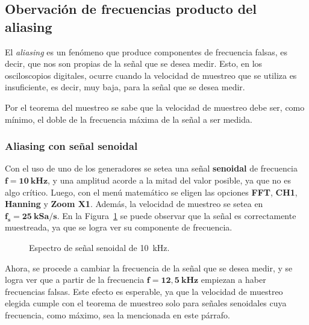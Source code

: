   \pagebreak
  \subsection{Obervación de frecuencias producto del aliasing}
    El \textit{aliasing} es un fenómeno que produce componentes de frecuencia falsas, es decir,
    que nos son propias de la señal que se desea medir. Esto, en los osciloscopios digitales,
    ocurre cuando la velocidad de muestreo que se utiliza es insuficiente, es decir, muy baja,
    para la señal que se desea medir.
    
    Por el teorema del muestreo se sabe que la velocidad de muestreo debe ser, como mínimo, el
    doble de la frecuencia máxima de la señal a ser medida.

    \subsubsection{Aliasing con señal senoidal}
      Con el uso de uno de los generadores se setea una señal \textbf{senoidal} de frecuencia
      $\mathbf{f = 10~kHz}$, y una amplitud acorde a la mitad del valor posible, ya que no es
      algo crítico. Luego, con el menú matemático se eligen las opciones \textbf{FFT}, \textbf{CH1},
      \textbf{Hanning} y \textbf{Zoom X1}. Además, la velocidad de muestreo se setea en 
      $\mathbf{f_s = 25~kSa/s}$. En la Figura~\ref{fig:Exp3Señal10k} se puede observar que la señal 
      es correctamente muestreada, ya que se logra ver su componente de frecuencia.
      
      \begin{figure}[H]
        \centering
        \caption{Espectro de señal senoidal de 10~kHz.}
        \label{fig:Exp3Señal10k}
      \end{figure}
      
      Ahora, se procede a cambiar la frecuencia de la señal que se desea medir, y se logra ver que
      a partir de la frecuencia $\mathbf{f = 12,5~kHz}$ empiezan a haber frecuencias falsas. Este
      efecto es esperable, ya que la velocidad de muestreo elegida cumple con el teorema de muestreo
      solo para señales senoidales cuya frecuencia, como máximo, sea la mencionada en este párrafo.

